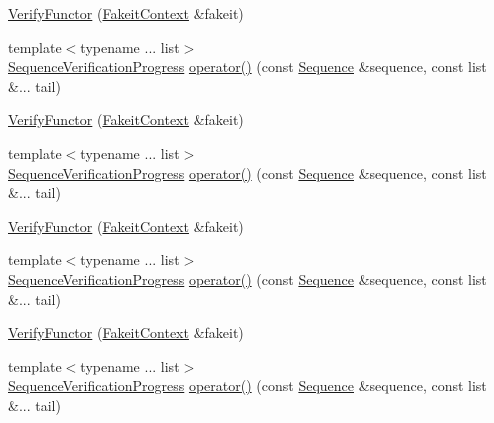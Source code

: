 \begin{DoxyCompactItemize}
\item 
\mbox{\hyperlink{classfakeit_1_1VerifyFunctor_ae85e5c4e5d0964fe41d78ffa7be7f12d}{Verify\+Functor}} (\mbox{\hyperlink{structfakeit_1_1FakeitContext}{Fakeit\+Context}} \&fakeit)
\item 
{\footnotesize template$<$typename ... list$>$ }\\\mbox{\hyperlink{classfakeit_1_1SequenceVerificationProgress}{Sequence\+Verification\+Progress}} \mbox{\hyperlink{classfakeit_1_1VerifyFunctor_a402a212d37bb558e53493cb9ab866947}{operator()}} (const \mbox{\hyperlink{classfakeit_1_1Sequence}{Sequence}} \&sequence, const list \&... tail)
\item 
\mbox{\hyperlink{classfakeit_1_1VerifyFunctor_ae85e5c4e5d0964fe41d78ffa7be7f12d}{Verify\+Functor}} (\mbox{\hyperlink{structfakeit_1_1FakeitContext}{Fakeit\+Context}} \&fakeit)
\item 
{\footnotesize template$<$typename ... list$>$ }\\\mbox{\hyperlink{classfakeit_1_1SequenceVerificationProgress}{Sequence\+Verification\+Progress}} \mbox{\hyperlink{classfakeit_1_1VerifyFunctor_a402a212d37bb558e53493cb9ab866947}{operator()}} (const \mbox{\hyperlink{classfakeit_1_1Sequence}{Sequence}} \&sequence, const list \&... tail)
\item 
\mbox{\hyperlink{classfakeit_1_1VerifyFunctor_ae85e5c4e5d0964fe41d78ffa7be7f12d}{Verify\+Functor}} (\mbox{\hyperlink{structfakeit_1_1FakeitContext}{Fakeit\+Context}} \&fakeit)
\item 
{\footnotesize template$<$typename ... list$>$ }\\\mbox{\hyperlink{classfakeit_1_1SequenceVerificationProgress}{Sequence\+Verification\+Progress}} \mbox{\hyperlink{classfakeit_1_1VerifyFunctor_a402a212d37bb558e53493cb9ab866947}{operator()}} (const \mbox{\hyperlink{classfakeit_1_1Sequence}{Sequence}} \&sequence, const list \&... tail)
\item 
\mbox{\hyperlink{classfakeit_1_1VerifyFunctor_ae85e5c4e5d0964fe41d78ffa7be7f12d}{Verify\+Functor}} (\mbox{\hyperlink{structfakeit_1_1FakeitContext}{Fakeit\+Context}} \&fakeit)
\item 
{\footnotesize template$<$typename ... list$>$ }\\\mbox{\hyperlink{classfakeit_1_1SequenceVerificationProgress}{Sequence\+Verification\+Progress}} \mbox{\hyperlink{classfakeit_1_1VerifyFunctor_a402a212d37bb558e53493cb9ab866947}{operator()}} (const \mbox{\hyperlink{classfakeit_1_1Sequence}{Sequence}} \&sequence, const list \&... tail)
\item 

\end{DoxyCompactItemize}
